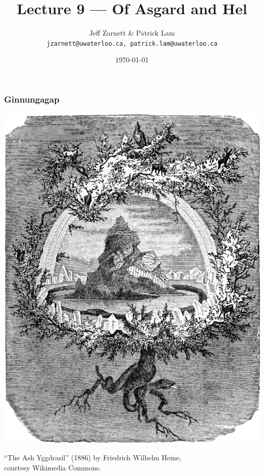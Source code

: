 

\title{Lecture 9 --- Of Asgard and Hel }

\author{Jeff Zarnett \& Patrick Lam \\ \small \texttt{jzarnett@uwaterloo.ca, patrick.lam@uwaterloo.ca}}
\date{\today}




\begin{frame}
  \titlepage

 \end{frame}

\begin{frame}
\frametitle{Ginnungagap}

\begin{center}
\includegraphics[height=.8\textheight]{images/L10-yggdrasil.jpg}

``The Ash Yggdrasil'' (1886) by Friedrich Wilhelm Heine, \\
courtesy Wikimedia Commons.
\end{center}





\end{frame}


